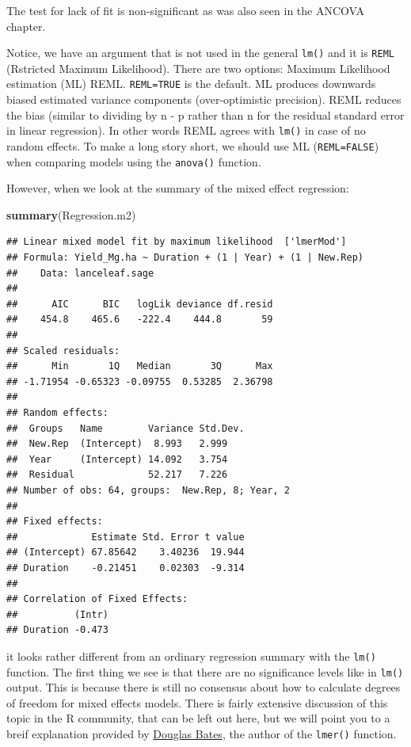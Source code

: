 \documentclass[letterpaper,]{book}
\newenvironment{Shaded}{\begin{snugshade}}{\end{snugshade}}
\newcommand{\KeywordTok}[1]{\textcolor[rgb]{0.13,0.29,0.53}{\textbf{#1}}}
\newcommand{\NormalTok}[1]{#1}
\begin{document}
The test for lack of fit is non-significant as was also seen in the ANCOVA chapter.

Notice, we have an argument that is not used in the general \texttt{lm()} and it is \texttt{REML} (Rstricted Maximum Likelihood). There are two options: Maximum Likelihood estimation (ML) REML. \texttt{REML=TRUE} is the default. ML produces downwards biased estimated variance components (over-optimistic precision). REML reduces the bias (similar to dividing by n - p rather than n for the residual standard error in linear regression). In other words REML agrees with \texttt{lm()} in case of no random effects. To make a long story short, we should use ML (\texttt{REML=FALSE}) when comparing models using the \texttt{anova()} function.

However, when we look at the summary of the mixed effect regression:

\begin{Shaded}
\begin{Highlighting}[]
\KeywordTok{summary}\NormalTok{(Regression.m2)}
\end{Highlighting}
\end{Shaded}

\begin{verbatim}
## Linear mixed model fit by maximum likelihood  ['lmerMod']
## Formula: Yield_Mg.ha ~ Duration + (1 | Year) + (1 | New.Rep)
##    Data: lanceleaf.sage
## 
##      AIC      BIC   logLik deviance df.resid 
##    454.8    465.6   -222.4    444.8       59 
## 
## Scaled residuals: 
##      Min       1Q   Median       3Q      Max 
## -1.71954 -0.65323 -0.09755  0.53285  2.36798 
## 
## Random effects:
##  Groups   Name        Variance Std.Dev.
##  New.Rep  (Intercept)  8.993   2.999   
##  Year     (Intercept) 14.092   3.754   
##  Residual             52.217   7.226   
## Number of obs: 64, groups:  New.Rep, 8; Year, 2
## 
## Fixed effects:
##             Estimate Std. Error t value
## (Intercept) 67.85642    3.40236  19.944
## Duration    -0.21451    0.02303  -9.314
## 
## Correlation of Fixed Effects:
##          (Intr)
## Duration -0.473
\end{verbatim}

it looks rather different from an ordinary regression summary with the \texttt{lm()} function. The first thing we see is that there are no significance levels like in \texttt{lm()} output. This is because there is still no consensus about how to calculate degrees of freedom for mixed effects models. There is fairly extensive discussion of this topic in the R community, that can be left out here, but we will point you to a breif explanation provided by \href{https://stat.ethz.ch/pipermail/r-help/2006-May/094765.html}{Douglas Bates}, the author of the \texttt{lmer()} function.
\end{document}
